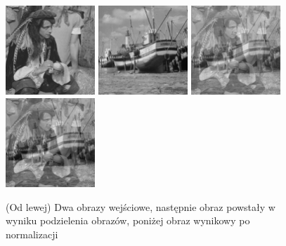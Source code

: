 \documentclass[final,a4paper,openany,12pt]{mwbk}
\begin{document}
\begin{figure}[H]
	\begin{center}
		\includegraphics[width=0.3\textwidth]{2/2Gray_Img1_Div_Original}
		\includegraphics[width=0.3\textwidth]{2/2Gray_Img2_Div_Original}
		\includegraphics[width=0.3\textwidth]{2/2Gray_Img_Div_Result}
		\includegraphics[width=0.3\textwidth]{2/2Gray_Img_Div_Result_Norm}
	\end{center}
	\caption{(Od lewej) Dwa obrazy wejściowe, następnie obraz powstały w wyniku podzielenia obrazów, poniżej obraz wynikowy po normalizacji }
\end{figure}
\end{document}
